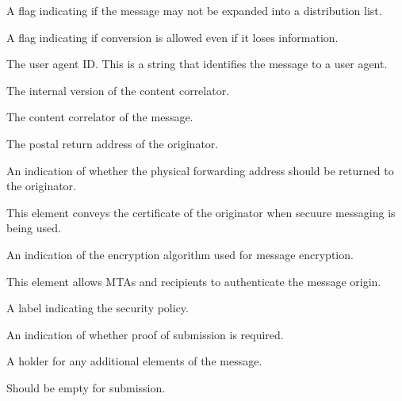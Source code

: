 \begin{describe}
\item[\verb|dl\_expansion\_prohibited|:]	A flag indicating if the
message may not be expanded into a distribution list.

\item[\verb|conversion\_with\_loss\_prohibited|:]	A flag indicating if
conversion is allowed even if it loses information.

\item[\verb|ua\_id|:]	The user agent ID. This is a string that
identifies the message to a user agent.

\item[\verb|pp\_content\_correlator|:]	The internal version of the
content correlator.

\item[\verb|general\_content\_correlator|:]	The content correlator
of the message.

\item[\verb|originator\_return\_address|:]	The postal return
address of the originator.

\item[\verb|forwarding\_request|:]	An indication of whether
the physical forwarding address should be returned to the originator.

\item[\verb|originator\_certificate|:]	This element conveys the
certificate of the originator when secuure messaging is being used.

\item[\verb|algorithm\_identifier|:]	An indication of the
encryption algorithm used for message encryption.

\item[\verb|message\_origin\_auth\_check|:]	This element allows
MTAs and recipients to \linebreak[3] authenticate the message origin.

\item[\verb|security\_label|:]	A label indicating the security policy.

\item[\verb|proof\_of\_submission|:]	An indication of whether proof
of submission is \linebreak[3] required.

\item[\verb|per\_message\_extensions|:]	A holder for any additional
elements of the message.

\item[\verb|Oaddress|:]	Should be empty for submission.


\end{describe}
